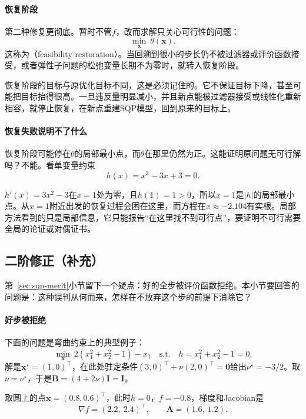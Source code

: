 \paragraph{恢复阶段}
第二种修复更彻底。暂时不管$f$，改而求解只关心可行性的问题：
\begin{equation}
 \min_{\bm{x}}\ \theta(\bm{x}).
 \label{eq:sqp-restoration}
\end{equation}
这称为（feasibility restoration）。当回溯到很小的步长仍不被过滤器或评价函数接受，或者弹性子问题的松弛变量长期不为零时，就转入恢复阶段。

恢复阶段的目标与原优化目标不同，这是必须记住的。它不保证目标下降，甚至可能把目标抬得很高。一旦违反量明显减小，并且新点能被过滤器接受或线性化重新相容，就停止恢复，在新点重建SQP模型，回到原来的目标上。

\paragraph{恢复失败说明不了什么}
恢复阶段可能停在$\theta$的局部最小点，而$\theta$在那里仍然为正。这能证明原问题无可行解吗？不能。看单变量约束
\[
 h(x)=x^3-3x+3=0.
\]

$h'(x)=3x^2-3$在$x=1$处为零，且$h(1)=1>0$，所以$x=1$是$\lvert h\rvert$的局部最小点。从$x=1$附近出发的恢复过程会困在这里，而方程在$x\approx-2.104$有实根。局部方法看到的只是局部信息，它只能报告“在这里找不到可行点”，要证明不可行需要全局的论证或对偶证书。

\subsection{二阶修正（补充）}
\label{sec:sqp-soc}

第~\ref{sec:sqp-merit}小节留下一个疑点：好的全步被评价函数拒绝。本小节要回答的问题是：这种误判从何而来，怎样在不放弃这个步的前提下消除它？

\paragraph{好步被拒绝}
下面的问题是弯曲约束上的典型例子：
\begin{equation}
 \min_{\bm{x}}\ 2(x_1^2+x_2^2-1)-x_1
 \quad\text{s.t.}\quad h=x_1^2+x_2^2-1=0.
 \label{eq:sqp-maratos}
\end{equation}
解是$\bm{x}^\star=(1,0)^\top$，在此处驻定条件$(3,0)^\top+\nu(2,0)^\top=\bm{0}$给出$\nu^\star=-3/2$。取$\nu=\nu^\star$，于是$\bm{B}=(4+2\nu)\bm{I}=\bm{I}$。

取圆上的点$\bm{x}=(0.8,0.6)^\top$，此时$h=0$，$f=-0.8$，梯度和Jacobian是
\[
 \nabla f=(2.2,\ 2.4)^\top,\qquad\bm{A}=(1.6,\ 1.2).
\]

